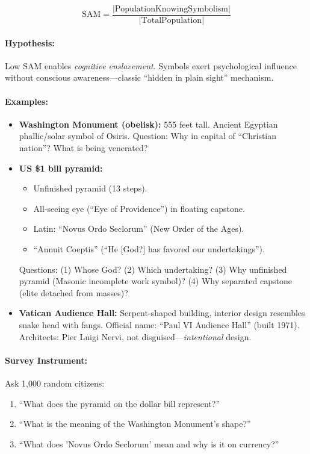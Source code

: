 \documentclass[11pt,a4paper]{article}
\theoremstyle{definition}
\theoremstyle{remark}
\begin{document}
\[
\text{SAM} = \frac{|\text{PopulationKnowingSymbolism}|}{|\text{TotalPopulation}|}
\]

\paragraph{Hypothesis:}
Low SAM enables \textit{cognitive enslavement}. Symbols exert psychological influence without conscious awareness—classic ``hidden in plain sight'' mechanism.

\paragraph{Examples:}
\begin{itemize}
\item \textbf{Washington Monument (obelisk):} 555 feet tall. Ancient Egyptian phallic/solar symbol of Osiris. Question: Why in capital of ``Christian nation''? What is being venerated?
\item \textbf{US \$1 bill pyramid:}
  \begin{itemize}
  \item Unfinished pyramid (13 steps).
  \item All-seeing eye (``Eye of Providence'') in floating capstone.
  \item Latin: ``Novus Ordo Seclorum'' (New Order of the Ages).
  \item ``Annuit Coeptis'' (``He [God?] has favored our undertakings'').
  \end{itemize}
  Questions: (1) Whose God? (2) Which undertaking? (3) Why unfinished pyramid (Masonic incomplete work symbol)? (4) Why separated capstone (elite detached from masses)?
\item \textbf{Vatican Audience Hall:} Serpent-shaped building, interior design resembles snake head with fangs. Official name: ``Paul VI Audience Hall'' (built 1971). Architects: Pier Luigi Nervi, not disguised—\textit{intentional} design.
\end{itemize}

\paragraph{Survey Instrument:}
Ask 1,000 random citizens:
\begin{enumerate}
\item ``What does the pyramid on the dollar bill represent?''
\item ``What is the meaning of the Washington Monument's shape?''
\item ``What does 'Novus Ordo Seclorum' mean and why is it on currency?''
\end{enumerate}
\end{document}
